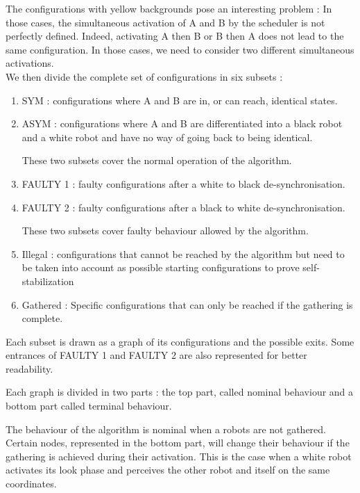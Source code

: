 \documentclass[11pt]{article}
\begin{document}
The configurations with yellow backgrounds pose an interesting problem :
In those cases, the simultaneous activation of A and B by the scheduler is not perfectly defined. Indeed, activating A then B or B then A does not lead to the same configuration. In those cases, we need to consider two different simultaneous activations.
\\

We then divide the complete set of configurations in six subsets :

\begin{enumerate}[label=(\alph*)]
\item SYM : configurations where A and B are in, or can reach, identical states.
\item ASYM : configurations where A and B are differentiated into a black robot and a white robot and have no way of going back to being identical.

These two subsets cover the normal operation of the algorithm.

\item FAULTY 1 : faulty configurations after a white to black de-synchronisation.
\item FAULTY 2 : faulty configurations after a black to white de-synchronisation.

These two subsets cover faulty behaviour allowed by the algorithm.

\item Illegal : configurations that cannot be reached by the algorithm but need to be taken into account as possible starting configurations to prove self-stabilization
\item Gathered : Specific configurations that can only be reached if the gathering is complete.
  

\end{enumerate}


Each subset is drawn as a graph of its configurations and the possible exits. Some entrances of FAULTY 1 and FAULTY 2 are also represented for better readability.

Each graph is divided in two parts : the top part, called nominal behaviour and a bottom part called terminal behaviour. 

The behaviour of the algorithm is nominal when a robots are not gathered. Certain nodes, represented in the bottom part, will change their behaviour if the gathering is achieved during their activation. This is the case when a white robot activates its look phase and perceives the other robot and itself on the same coordinates.
\end{document}
